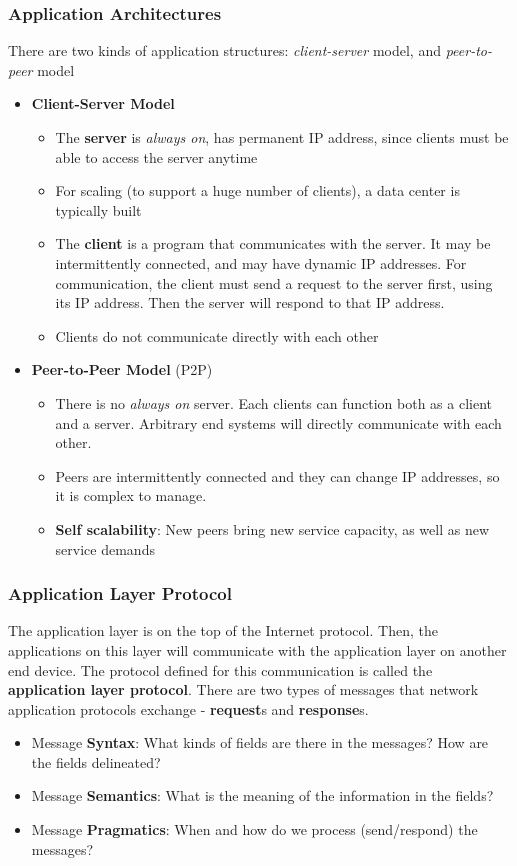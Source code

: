 \subsubsection{Application Architectures}
There are two kinds of application structures: \textit{client-server} model, and \textit{peer-to-peer} model
\begin{itemize}
	\item \textbf{Client-Server Model}
	\begin{itemize}
		\item The \textbf{server} is \textit{always on}, has permanent IP address, since clients must be able to access the server anytime
		\item For scaling (to support a huge number of clients), a data center is typically built
		\item The \textbf{client} is a program that communicates with the server. It may be intermittently connected, and may have dynamic IP addresses. For communication, the client must send a request to the server first, using its IP address. Then the server will respond to that IP address.
		\item Clients do not communicate directly with each other
	\end{itemize}
	\item \textbf{Peer-to-Peer Model} (P2P)
	\begin{itemize}
		\item There is no \textit{always on} server. Each clients can function both as a client and a server. Arbitrary end systems will directly communicate with each other.
		\item Peers are intermittently connected and they can change IP addresses, so it is complex to manage.
		\item \textbf{Self scalability}: New peers bring new service capacity, as well as new service demands 
	\end{itemize}
\end{itemize}

\subsubsection{Application Layer Protocol}
The application layer is on the top of the Internet protocol. Then, the applications on this layer will communicate with the application layer on another end device. The protocol defined for this communication is called the \textbf{application layer protocol}. There are two types of messages that network application protocols exchange - \textbf{request}s and \textbf{response}s.
\begin{itemize}
	\item Message \textbf{Syntax}: What kinds of fields are there in the messages? How are the fields delineated?
	\item Message \textbf{Semantics}: What is the meaning of the information in the fields?
	\item Message \textbf{Pragmatics}: When and how do we process (send/respond) the messages?
\end{itemize}

